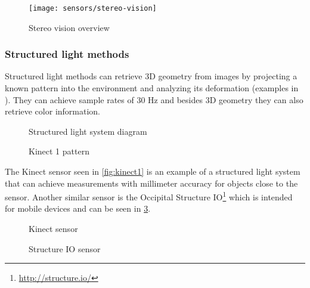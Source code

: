 \begin{figure}[H]
	\centering
	\texttt{[image: sensors/stereo-vision]}
	\caption[Stereo vision overview]{Stereo vision overview \cite{Yang2014}}
	\label{fig:stereo-vision}
\end{figure}


\subsubsection{Structured light methods}

Structured light methods can retrieve 3D geometry from images by projecting a known pattern into the environment and analyzing its deformation (examples in ). They can achieve sample rates of 30 Hz and besides 3D geometry they can also retrieve color information.


\begin{figure}[H]
	\begin{floatrow}[2]
		{\caption[Structured light system diagram]{Structured light system diagram\protect\footnotemark}\label{fig:structured-light}}

		{\caption[Kinect 1  pattern]{Kinect 1  pattern\protect\footnotemark}\label{fig:kinect1-ir}}
	\end{floatrow}
\end{figure}


The Kinect sensor seen in \cref{fig:kinect1} is an example of a structured light system that can achieve measurements with millimeter accuracy for objects close to the sensor. Another similar sensor is the Occipital Structure IO\footnote{\url{http://structure.io/}} which is intended for mobile devices and can be seen in \cref{fig:structure-io}.


\begin{figure}[H]
	\begin{floatrow}[2]
		{\caption[Kinect 2 sensor]{Kinect sensor\protect\footnotemark}\label{fig:kinect1}}

		{\caption[Structure IO sensor]{Structure IO sensor\protect\footnotemark}\label{fig:structure-io}}
	\end{floatrow}
\end{figure}


